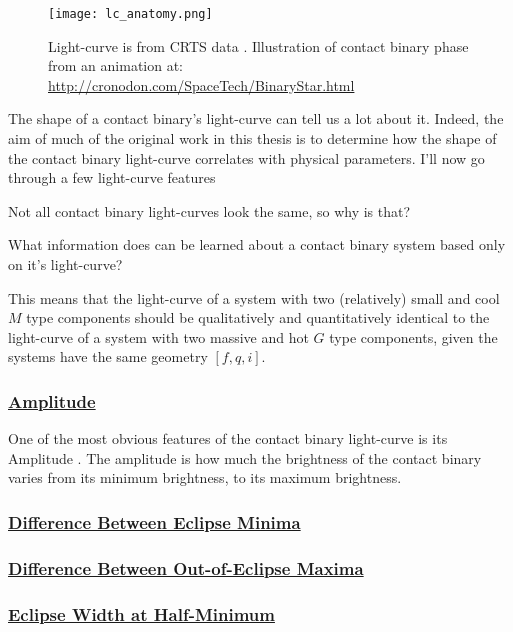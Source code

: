 \documentclass[12pt]{article} %
\numberwithin{equation}{section} %
\begin{document}
\begin{figure}[H]
\centering
\texttt{[image: lc\_anatomy.png]}
\caption{Light-curve is from CRTS data \citep{drake2014catalina}. Illustration of contact binary phase from an animation at: \url{http://cronodon.com/SpaceTech/BinaryStar.html}}
\label{fig: lc_anatomy}
\end{figure}

The shape of a contact binary's light-curve can tell us a lot about it. Indeed, the aim of much of the original work in this thesis is to determine how the shape of the contact binary light-curve correlates with physical parameters. I'll now go through a few light-curve features 

Not all contact binary light-curves look the same, so why is that?

What information does can be learned about a contact binary system based only on it's light-curve?

This means that the light-curve of a system with two (relatively) small and cool $M$ type components should be qualitatively and quantitatively identical to the light-curve of a system with two massive and hot $G$ type components, given the systems have the same geometry $[f,q,i]$.

\subsubsection[Amplitude]{\hyperlink{toc}{Amplitude}} \label{sec: Amplitude}

One of the most obvious features of the contact binary light-curve is its Amplitude . The amplitude is how much the brightness of the contact binary varies from its minimum brightness, to its maximum brightness.

\subsubsection[Difference Between Eclipse Minima]{\hyperlink{toc}{Difference Between Eclipse Minima}} \label{sec: Difference Between Eclipse Minima}

\subsubsection[Difference Between Out-of-Eclipse Maxima]{\hyperlink{toc}{Difference Between Out-of-Eclipse Maxima}} \label{sec: Difference Between Out-of-Eclipse Maxima}

\subsubsection[Eclipse Width at Half-Minimum]{\hyperlink{toc}{Eclipse Width at Half-Minimum}} \label{sec: Eclipse Width at Half-Minimum}
\end{document}
